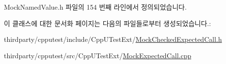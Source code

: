 Mock\+Named\+Value.\+h 파일의 154 번째 라인에서 정의되었습니다.



이 클래스에 대한 문서화 페이지는 다음의 파일들로부터 생성되었습니다.\+:\begin{DoxyCompactItemize}
\item 
thirdparty/cpputest/include/\+Cpp\+U\+Test\+Ext/\hyperlink{_mock_checked_expected_call_8h}{Mock\+Checked\+Expected\+Call.\+h}\item 
thirdparty/cpputest/src/\+Cpp\+U\+Test\+Ext/\hyperlink{_mock_expected_call_8cpp}{Mock\+Expected\+Call.\+cpp}\end{DoxyCompactItemize}
